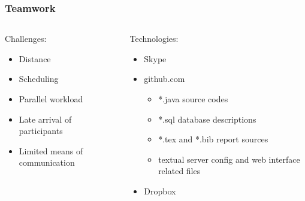 \begin{frame}
	\frametitle{Teamwork}
	\begin{columns}[t]
		\begin{column}[t]{0.4\linewidth}
			Challenges:
			\begin{itemize}
				\item Distance
				\item Scheduling
				\item Parallel workload
				\item Late arrival of participants
				\item Limited means of communication
			\end{itemize}
		\end{column}
		\begin{column}[t]{0.6\linewidth}
			Technologies:
			\begin{itemize}
				\item Skype
				\item github.com
				\begin{itemize}
					\item *.java source codes
					\item *.sql database descriptions
					\item *.tex and *.bib report sources
					\item textual server config and web interface related files
				\end{itemize}
				\item Dropbox
			\end{itemize}
		\end{column}		
	\end{columns}
\end{frame}
